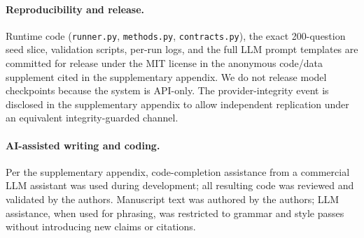\documentclass[11pt]{article}
\begin{document}
\paragraph{Reproducibility and release.} Runtime code (\texttt{runner.py}, \texttt{methods.py}, \texttt{contracts.py}), the exact 200-question seed slice, validation scripts, per-run logs, and the full LLM prompt templates are committed for release under the MIT license in the anonymous code/data supplement cited in the supplementary appendix. We do not release model checkpoints because the system is API-only. The provider-integrity event is disclosed in the supplementary appendix to allow independent replication under an equivalent integrity-guarded channel.

\paragraph{AI-assisted writing and coding.} Per the supplementary appendix, code-completion assistance from a commercial LLM assistant was used during development; all resulting code was reviewed and validated by the authors. Manuscript text was authored by the authors; LLM assistance, when used for phrasing, was restricted to grammar and style passes without introducing new claims or citations.


\end{document}
